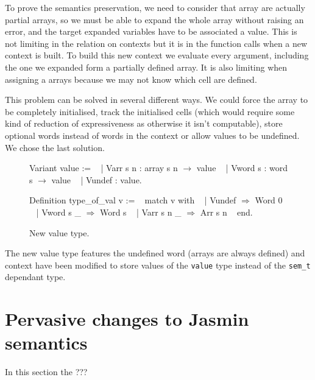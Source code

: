 \documentclass{article}
\begin{document}
\medskip

To prove the semantics preservation, we need to consider that array are actually
partial arrays, so we must be able to expand the whole array without raising an
error, and the target expanded variables have to be associated a value. This is
not limiting in the relation on contexts but it is in the function calls when a
new context is built. To build this new context we evaluate every argument,
including the one we expanded form a partially defined array. It is also
limiting when assigning a arrays because we may not know which cell are defined.

This problem can be solved in several different ways. We could force the array
to be completely initialised, track the initialised cells (which would require
some kind of reduction of expressiveness as otherwise it isn't computable),
store optional words instead of words in the context or allow values to be
undefined. We chose the last solution.

\smallskip

\begin{figure}[t]
\obeylines\obeyspaces\ttfamily%
Variant value :=
~ | Varr s n : array s n \(\rightarrow\) value
~ | Vword s  : word  s   \(\rightarrow\) value
~ | Vundef   :              value.

Definition type\_of\_val v :=
~ match v with
~ | Vundef     \(\Rightarrow\) Word 0
~ | Vword s  \_ \(\Rightarrow\) Word s
~ | Varr s n \_ \(\Rightarrow\) Arr s n
~ end.
\normalfont%
\caption{New value type.}
\end{figure}

The new value type features the undefined word (arrays are always defined) and
context have been modified to store values of the \texttt{value} type instead of
the \texttt{sem\_t} dependant type.


\section{Pervasive changes to Jasmin semantics}\label{sec:perch}

In this section the ???
\end{document}
